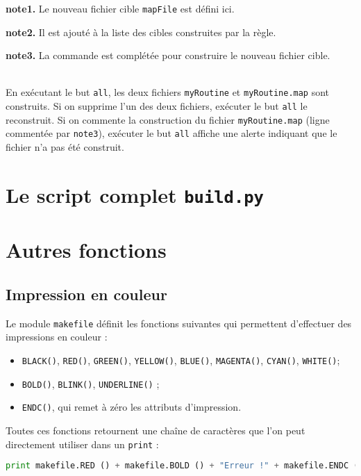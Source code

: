 \documentclass[a4paper,11pt]{extarticle}
\begin{document}
{\bf note1.} Le nouveau fichier cible \texttt{mapFile} est défini ici.

{\bf note2.} Il est ajouté à la liste des cibles construites par la règle.

{\bf note3.} La commande est complétée pour construire le nouveau fichier cible.
\\~

En exécutant le but \texttt{all}, les deux fichiers \texttt{myRoutine} et \texttt{myRoutine.map} sont construits. Si on supprime l'un des deux fichiers, exécuter le but \texttt{all} le reconstruit. Si on commente la construction du fichier \texttt{myRoutine.map} (ligne commentée par \texttt{note3}), exécuter le but \texttt{all} affiche une alerte indiquant que le fichier n'a pas été construit.












\section{Le script complet \texttt{build.py}}












\section{Autres fonctions}

\subsection{Impression en couleur}

Le module \texttt{makefile} définit les fonctions suivantes qui permettent d'effectuer des impressions en couleur :
\begin{itemize}
  \item \texttt{BLACK()}, \texttt{RED()}, \texttt{GREEN()}, \texttt{YELLOW()}, \texttt{BLUE()}, \texttt{MAGENTA()}, \texttt{CYAN()}, \texttt{WHITE()};
  \item \texttt{BOLD()}, \texttt{BLINK()}, \texttt{UNDERLINE()} ;
  \item \texttt{ENDC()}, qui remet à zéro les attributs d'impression.
\end{itemize}
Toutes ces fonctions retournent une chaîne de caractères que l'on peut directement utiliser dans un \texttt{print} :
\begin{lstlisting}[language=py]
print makefile.RED () + makefile.BOLD () + "Erreur !" + makefile.ENDC ()
\end{lstlisting}
\end{document}
